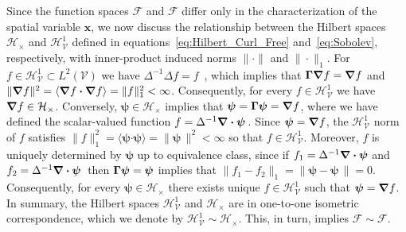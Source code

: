 \documentclass[leqno,onefignum,onetabnum]{siamltex1213}
\newcommand{\Vc}{\mathcal{V}}
\newcommand{\Hc}{\mathcal{H}}
\newcommand{\Fc}{\mathcal{F}}
\newcommand{\Hs}{\mathscr{H}}
\newcommand{\Fs}{\mathscr{F}}
\newcommand\bGamma{\mbox{\boldmath${\Gamma}$}}
\newcommand\bnabla{\mbox{\boldmath${\nabla}$}}
\providecommand\bcdot{\boldsymbol{\cdot}}
\newcommand{\vecx}{\boldsymbol{x}}
\newcommand{\vecpsi}{\boldsymbol{\psi}}
\begin{document}
Since the function spaces $\Fs$ and $\Fc$ differ
only in the characterization of the spatial variable $\vecx$, we now
discuss the relationship between the Hilbert spaces $\Hc_\times$ and
$\Hs^1_{\Vc}$ defined in equations~\eqref{eq:Hilbert_Curl_Free}
and~\eqref{eq:Sobolev}, respectively, with inner-product induced norms 
$\|\cdot\|$ and $\|\cdot\|_1$. For $f\in\Hs^1_{\Vc}\subset L^2(\Vc)$ we have 
$\Delta^{-1}\Delta f=f$~\cite{Stakgold:BVP:2000}, which implies that
$\bGamma\bnabla f=\bnabla f$ and
$\|\bnabla f\|^2=\langle\bnabla f\bcdot\bnabla f\rangle=\|f\|_1^2<\infty$. Consequently, for every  
$f\in\Hs^1_{\Vc}$ we have $\bnabla f\in\Hc_\times$. Conversely,
$\vecpsi\in\Hc_\times$ implies that $\vecpsi=\bGamma\vecpsi=\bnabla f$, where
we have defined the scalar-valued function
$f=\Delta^{-1}\bnabla \bcdot\vecpsi\,$. Since $\vecpsi=\bnabla f$, the
$\Hs^1_{\Vc}$ norm of $f$ satisfies
$\|f\|_1^2=\langle\vecpsi\bcdot\vecpsi\rangle=\|\vecpsi\,\|^2<\infty$ so that
$f\in\Hs^1_{\Vc}$. Moreover, $f$ is uniquely determined by $\vecpsi$ up
to equivalence class, since if $f_1=\Delta^{-1}\bnabla \bcdot\vecpsi$ and
$f_2=\Delta^{-1}\bnabla \bcdot\vecpsi\,$ then $\bGamma\vecpsi=\vecpsi$ implies
that $\|f_1-f_2\|_1=\|\vecpsi-\vecpsi\,\|=0$. Consequently, for every  
$\vecpsi\in\Hc_\times$ there exists unique $f\in\Hs^1_{\Vc}$ such that
$\vecpsi=\bnabla f$.  In summary, the Hilbert spaces $\Hs^1_{\Vc}$ and
$\Hc_\times$ are in one-to-one isometric correspondence, which we denote by
$\Hs^1_{\Vc}\sim\Hc_\times$. This, in turn, implies  $\Fs\sim\Fc$.  
\end{document}
